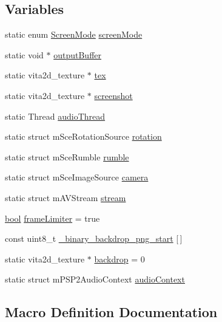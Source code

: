 \subsection*{Variables}
\begin{DoxyCompactItemize}
\item 
static enum \mbox{\hyperlink{3ds_2main_8c_aefe4cd50ac123b6c800eede74968a353}{Screen\+Mode}} \mbox{\hyperlink{psp2-context_8c_aa6506f4016bae669706872ea621efd8c}{screen\+Mode}}
\item 
static void $\ast$ \mbox{\hyperlink{psp2-context_8c_a0779122b7156629157afcf1a35c372ef}{output\+Buffer}}
\item 
static vita2d\+\_\+texture $\ast$ \mbox{\hyperlink{psp2-context_8c_a8ee643382d084f154f1b1ff39df7b3b9}{tex}}
\item 
static vita2d\+\_\+texture $\ast$ \mbox{\hyperlink{psp2-context_8c_a0204020e80625e713fc729f653aa63de}{screenshot}}
\item 
static Thread \mbox{\hyperlink{psp2-context_8c_a98449c0540702b481c40de8a3918d342}{audio\+Thread}}
\item 
static struct m\+Sce\+Rotation\+Source \mbox{\hyperlink{psp2-context_8c_afe9e4b0b66378e39ad7095d01ab7b23b}{rotation}}
\item 
static struct m\+Sce\+Rumble \mbox{\hyperlink{psp2-context_8c_aeb7982d490fa2271fb0cea4c4d5200ee}{rumble}}
\item 
static struct m\+Sce\+Image\+Source \mbox{\hyperlink{psp2-context_8c_a87322b8f3ad7052507e06145194fe154}{camera}}
\item 
static struct m\+A\+V\+Stream \mbox{\hyperlink{psp2-context_8c_afcb178a8ee7853c424423b8601eeaa78}{stream}}
\item 
\mbox{\hyperlink{libretro_8h_a4a26dcae73fb7e1528214a068aca317e}{bool}} \mbox{\hyperlink{psp2-context_8c_a79ad80572fd8710aecd999faddccfed8}{frame\+Limiter}} = true
\item 
const uint8\+\_\+t \mbox{\hyperlink{psp2-context_8c_a2365730f0a058820b7887cff8d39a829}{\+\_\+binary\+\_\+backdrop\+\_\+png\+\_\+start}} \mbox{[}$\,$\mbox{]}
\item 
static vita2d\+\_\+texture $\ast$ \mbox{\hyperlink{psp2-context_8c_a8dc5cadb8c411fc6334f22c3e6516e6a}{backdrop}} = 0
\item 
static struct m\+P\+S\+P2\+Audio\+Context \mbox{\hyperlink{psp2-context_8c_a659b36605d87e0119d74ca65de7dbf4c}{audio\+Context}}
\end{DoxyCompactItemize}


\subsection{Macro Definition Documentation}
\mbox{\label{psp2-context_8c_af8036da621bc91932e6148bc6bf50643}} 
